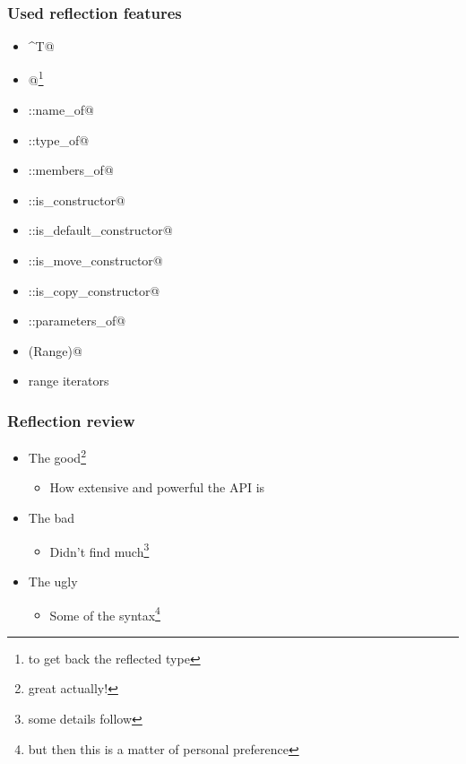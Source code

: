 \documentclass[compress,table,xcolor=table]{beamer}
\begin{document}
\begin{frame}[fragile]
  \frametitle{Used reflection features}
  \large
    \begin{itemize}
        \item \verb@^T@
        \item \verb@[: :]@\footnote{to get back the reflected type}
        \item \verb@meta::name_of@
        \item \verb@meta::type_of@
        \item \verb@meta::members_of@
        \item \verb@meta::is_constructor@
        \item \verb@meta::is_default_constructor@
        \item \verb@meta::is_move_constructor@
        \item \verb@meta::is_copy_constructor@
        \item \verb@meta::parameters_of@
        \item \verb@size(Range)@
        \item range iterators
    \end{itemize}
\end{frame}
\begin{frame}
  \frametitle{Reflection review}
    \Huge
    \begin{itemize}
    \item{The good\footnote{great actually!}}
        \begin{itemize}
        \Large
        \item{How extensive and powerful the API is}
        \end{itemize}
    \item{The bad}
        \begin{itemize}
        \Large
        \item{Didn't find much\footnote{some details follow}}
        \end{itemize}
    \item{The ugly}
        \begin{itemize}
        \Large
        \item{Some of the syntax\footnote{but then this is a matter of personal preference}}
        \end{itemize}
    \end{itemize}
\end{frame}
\end{document}

